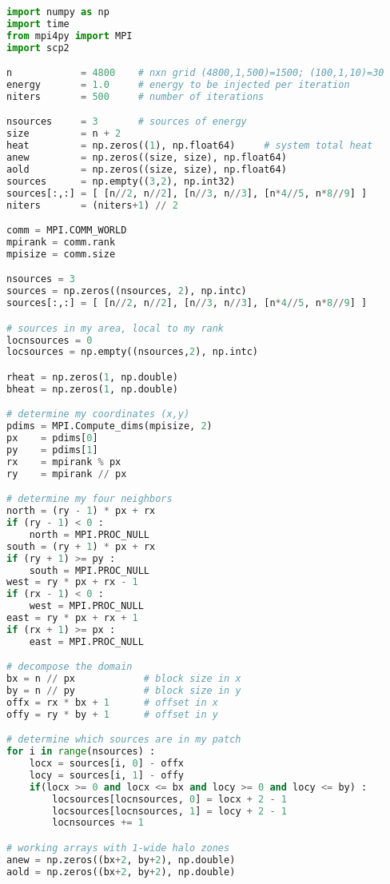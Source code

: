 \begin{lstlisting}[language=Python, caption={Parallel Cython implementation of the stencil test case - Python main code.}]
import numpy as np
import time
from mpi4py import MPI   
import scp2

n            = 4800    # nxn grid (4800,1,500)=1500; (100,1,10)=30
energy       = 1.0     # energy to be injected per iteration
niters       = 500     # number of iterations

nsources     = 3       # sources of energy
size         = n + 2
heat         = np.zeros((1), np.float64)     # system total heat
anew         = np.zeros((size, size), np.float64)
aold         = np.zeros((size, size), np.float64)
sources      = np.empty((3,2), np.int32)
sources[:,:] = [ [n//2, n//2], [n//3, n//3], [n*4//5, n*8//9] ]
niters       = (niters+1) // 2

comm = MPI.COMM_WORLD
mpirank = comm.rank
mpisize = comm.size

nsources = 3
sources = np.zeros((nsources, 2), np.intc)
sources[:,:] = [ [n//2, n//2], [n//3, n//3], [n*4//5, n*8//9] ]

# sources in my area, local to my rank
locnsources = 0
locsources = np.empty((nsources,2), np.intc)

rheat = np.zeros(1, np.double)
bheat = np.zeros(1, np.double)

# determine my coordinates (x,y)
pdims = MPI.Compute_dims(mpisize, 2)
px    = pdims[0]
py    = pdims[1]
rx    = mpirank % px
ry    = mpirank // px

# determine my four neighbors
north = (ry - 1) * px + rx
if (ry - 1) < 0 :
    north = MPI.PROC_NULL
south = (ry + 1) * px + rx
if (ry + 1) >= py :
    south = MPI.PROC_NULL
west = ry * px + rx - 1
if (rx - 1) < 0 :
    west = MPI.PROC_NULL
east = ry * px + rx + 1
if (rx + 1) >= px :
    east = MPI.PROC_NULL

# decompose the domain
bx = n // px            # block size in x
by = n // py            # block size in y
offx = rx * bx + 1      # offset in x
offy = ry * by + 1      # offset in y

# determine which sources are in my patch
for i in range(nsources) :
    locx = sources[i, 0] - offx
    locy = sources[i, 1] - offy
    if(locx >= 0 and locx <= bx and locy >= 0 and locy <= by) :
        locsources[locnsources, 0] = locx + 2 - 1
        locsources[locnsources, 1] = locy + 2 - 1
        locnsources += 1

# working arrays with 1-wide halo zones
anew = np.zeros((bx+2, by+2), np.double)
aold = np.zeros((bx+2, by+2), np.double)


\end{lstlisting}
